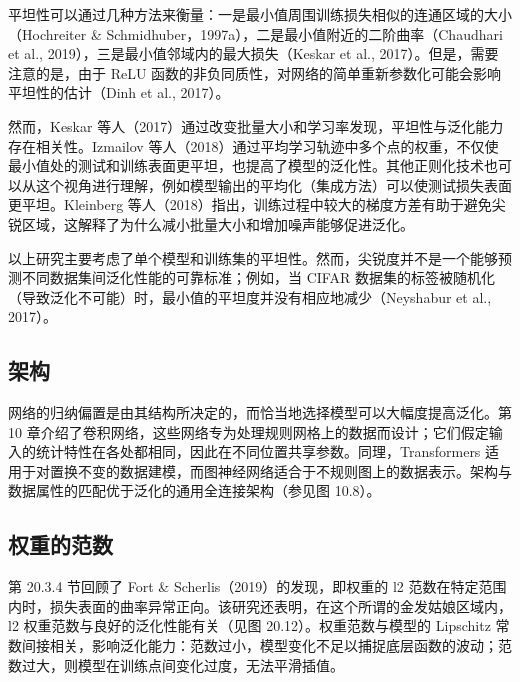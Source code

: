 平坦性可以通过几种方法来衡量：一是最小值周围训练损失相似的连通区域的大小（Hochreiter \& Schmidhuber，1997a），二是最小值附近的二阶曲率（Chaudhari et al., 2019），三是最小值邻域内的最大损失（Keskar et al., 2017）。但是，需要注意的是，由于 ReLU 函数的非负同质性，对网络的简单重新参数化可能会影响平坦性的估计（Dinh et al., 2017）。

然而，Keskar 等人（2017）通过改变批量大小和学习率发现，平坦性与泛化能力存在相关性。Izmailov 等人（2018）通过平均学习轨迹中多个点的权重，不仅使最小值处的测试和训练表面更平坦，也提高了模型的泛化性。其他正则化技术也可以从这个视角进行理解，例如模型输出的平均化（集成方法）可以使测试损失表面更平坦。Kleinberg 等人（2018）指出，训练过程中较大的梯度方差有助于避免尖锐区域，这解释了为什么减小批量大小和增加噪声能够促进泛化。

以上研究主要考虑了单个模型和训练集的平坦性。然而，尖锐度并不是一个能够预测不同数据集间泛化性能的可靠标准；例如，当 CIFAR 数据集的标签被随机化（导致泛化不可能）时，最小值的平坦度并没有相应地减少（Neyshabur et al., 2017）。

\subsection{架构}
网络的归纳偏置是由其结构所决定的，而恰当地选择模型可以大幅度提高泛化。第 10 章介绍了卷积网络，这些网络专为处理规则网格上的数据而设计；它们假定输入的统计特性在各处都相同，因此在不同位置共享参数。同理，Transformers 适用于对置换不变的数据建模，而图神经网络适合于不规则图上的数据表示。架构与数据属性的匹配优于泛化的通用全连接架构（参见图 10.8）。

\subsection{权重的范数}
第 20.3.4 节回顾了 Fort \& Scherlis（2019）的发现，即权重的 l2 范数在特定范围内时，损失表面的曲率异常正向。该研究还表明，在这个所谓的金发姑娘区域内，l2 权重范数与良好的泛化性能有关（见图 20.12）。权重范数与模型的 Lipschitz 常数间接相关，影响泛化能力：范数过小，模型变化不足以捕捉底层函数的波动；范数过大，则模型在训练点间变化过度，无法平滑插值。

